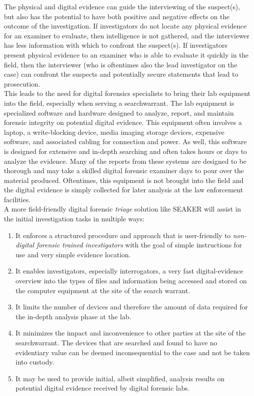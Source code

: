 \documentclass[12pt]{article}
\begin{document}
The physical and digital evidence can guide the interviewing of the suspect(s), but also
has the potential to have both positive and negative effects on the
outcome of the investigation. If investigators do not locate any physical evidence for an examiner
to evaluate, then intelligence is not gathered, and the interviewer has less information with which
to confront the suspect(s). If investigators present physical evidence to an examiner who is able to
evaluate it quickly in the field, then the interviewer (who is oftentimes also the lead investigator
on the case) can confront the suspects and potentially secure statements that lead to prosecution.\\

This leads to the need for digital forensics specialists to bring their lab equipment into the field,
especially when serving a \gls{searchwarrant}.  The lab equipment is specialized software and hardware
designed to analyze, report, and maintain forensic integrity on potential digital evidence.  This
equipment often involves a laptop, a write-blocking device, media imaging storage devices, expensive
software, and associated cabling for connection and power.  As well, this software is designed for
extensive and in-depth searching and often takes hours or days to analyze the evidence.  Many of the
reports from these systems are designed to be thorough and may take a skilled digital forensic
examiner days to pour over the material produced.  Oftentimes, this equipment is not brought
into the field and the digital evidence is simply collected for later analysis at the law
enforcement facilities.\\

A more field-friendly digital forensic {\em triage} solution like SEAKER will assist in the initial
investigation tasks in multiple ways:
\begin{enumerate}
  \item It enforces a structured procedure and approach that is user-friendly to {\em non-digital
  forensic trained investigators} with the goal of simple instructions for use and very simple 
  evidence location.
  \item It enables investigators, especially interrogators, a very fast digital-evidence overview
  into the types of files
  and information being accessed and stored on the computer equipment at the site of the search
  warrant.
  \item It limits the number of devices and therefore the amount of data required for the in-depth
  analysis phase at the lab.
  \item It minimizes the impact and inconvenience to other parties at the site of the 
  \gls{searchwarrant}.  The devices that are searched and found to have no evidentiary value can be
  deemed inconsequential to the case and not be taken into custody.
  \item It may be used to provide initial, albeit simplified, analysis results on potential
  digital evidence received by digital forensic labs.
\end{enumerate}
\end{document}
